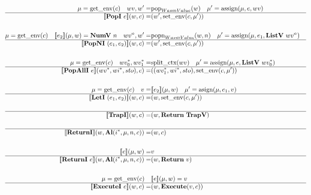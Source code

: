 \begin{align*}
\newline \\
  \mu = \text{get\_env}(c) \quad
  wv, w' =& \text{pop}_{WasmValue}(w) \quad
  \mu' = \text{assign}(\mu, e, wv) \\
  \hline
  \sem{\popi ~ e}(w, c) =& (w', \text{set\_env}(c, \mu')) \\
%
\newline \\
  \mu = \text{get\_env}(c) \quad
  \sem{e_2}(\mu, w) = \numv ~ n \quad
  wv^n, w' =& \text{popn}_{WasmValue}(w, n) \quad
  \mu' = \text{assign}(\mu, e_1, \listv ~ wv^n) \\
  \hline
  \sem{\popni ~ (e_1, e_2)}(w, c) =& (w', \text{set\_env}(c, \mu')) \\
%
\newline \\
  \mu = \text{get\_env}(c) \quad
  \seq{wv_0}, \seq{wv_1} =& \text{split\_ctx}(wv) \quad
  \mu' = \text{assign}(\mu, e, \listv ~ \seq{wv_0}) \\
  \hline
  \sem{\popalli ~ e}(\seq{wv}, \seq{wi}, sto), c)
  =&
  ((\seq{wv_1}, \seq{wi}, sto), \text{set\_env}(c, \mu')) \\
%
\newline \\
  \mu = \text{get\_env}(c) \quad
  v =& \sem{e_2}(\mu, w) \quad
  \mu' = \text{asign}(\mu, e_1, v) \\
  \hline
  \sem{\leti ~ (e_1, e_2)}(w, c)
  =&
  (w, \text{set\_env}(c, \mu')) \\
%
\newline \\
  \hline
  \sem{\trapi}(w, c) =& (w, \ret ~ \trapv) \\
%
\newline \\
  \hline
  \sem{\returni}(w, \al (\seq{i}, \mu, n, c)) =& (w, c) \\
%
\newline \\
  \sem{e}(\mu, w) =& v \\
  \hline
  \sem{\returni ~ e}(w, \al (\seq{i}, \mu, n, c)) =& (w, \ret ~ v) \\
%
\newline \\
  \mu = \text{get\_env}(c) \quad&
  \sem{e}(\mu, w) = v \\
  \hline
  \sem{\executei ~ e}(w, c) =& (w, \exe (v, c)) \\

\end{align*}
